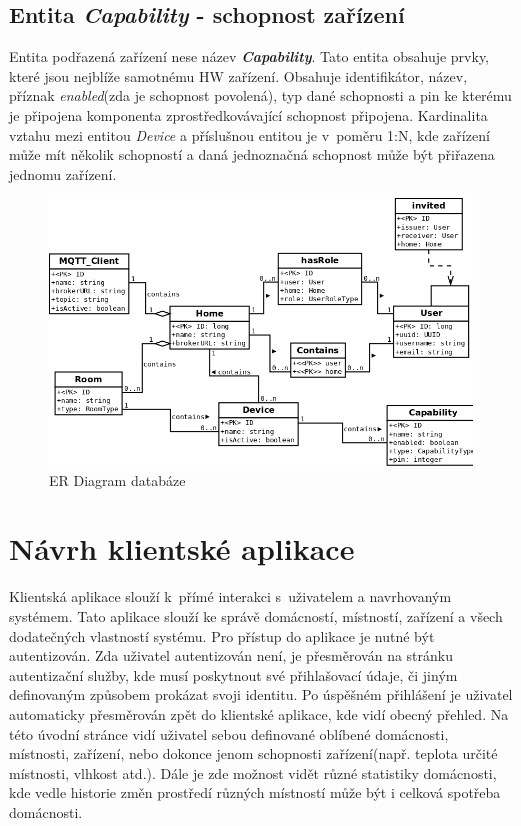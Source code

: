 \subsection*{Entita \emph{Capability} - schopnost zařízení}
\label{databaze:capability}
Entita podřazená zařízení nese název \textbf{\emph{Capability}}. Tato entita obsahuje prvky, které jsou nejblíže samotnému HW zařízení.
Obsahuje identifikátor, název, příznak \emph{enabled}(zda je schopnost povolená), typ dané schopnosti a pin ke kterému je připojena komponenta zprostředkovávající schopnost připojena.
Kardinalita vztahu mezi entitou \emph{Device} a příslušnou entitou je v~poměru 1:N, kde zařízení může mít několik schopností a daná jednoznačná schopnost může být přiřazena jednomu zařízení.

\begin{figure}[hbt]
  \centering
  \includegraphics[width=0.9 \linewidth]{obrazky-figures/erdiagram.png}
  \caption{ER Diagram databáze}
  \label{figure:er_databaze}
\end{figure}

\newpage
\section{Návrh klientské aplikace}
\label{navrh:frontend}

Klientská aplikace slouží k~přímé interakci s~uživatelem a navrhovaným systémem.
Tato aplikace slouží ke správě domácností, místností, zařízení a všech dodatečných vlastností systému.
Pro přístup do aplikace je nutné být autentizován.
Zda uživatel autentizován není, je přesměrován na stránku autentizační služby, kde musí poskytnout své přihlašovací údaje, či jiným definovaným způsobem prokázat svoji identitu.
Po úspěšném přihlášení je uživatel automaticky přesměrován zpět do klientské aplikace, kde vidí obecný přehled.
Na této úvodní stránce vidí uživatel sebou definované oblíbené domácnosti, místnosti, zařízení, nebo dokonce jenom schopnosti zařízení(např. teplota určité místnosti, vlhkost atd.).
Dále je zde možnost vidět různé statistiky domácnosti, kde vedle historie změn prostředí různých místností může být i celková spotřeba domácnosti.

